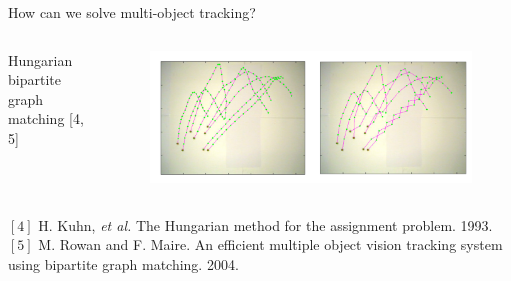 \documentclass[aspectratio=43]{beamer}
\begin{document}
		\begin{frame}{How can we solve multi-object tracking?}
			\begin{columns}
				\vspace{4mm}
				\centering
				{\scriptsize Hungarian bipartite graph matching [4, 5]}
				\vspace{-7mm}
				\begin{figure}
					\centering
					\includegraphics[width=0.7\linewidth]{figures/related_work/rowan_hungarian_bipartite.png}
				\end{figure}
				
			\end{columns}
			\vfill
			{\fontsize{4}{12} \selectfont
				$[4]$ H. Kuhn, \textit{et al.} The Hungarian method for the assignment problem. 1993. \\ \vspace{-2mm}
				$[5]$ M. Rowan and F. Maire. An efficient multiple object vision tracking system using bipartite graph matching. 2004.
			}
		\end{frame}
		
\end{document}
